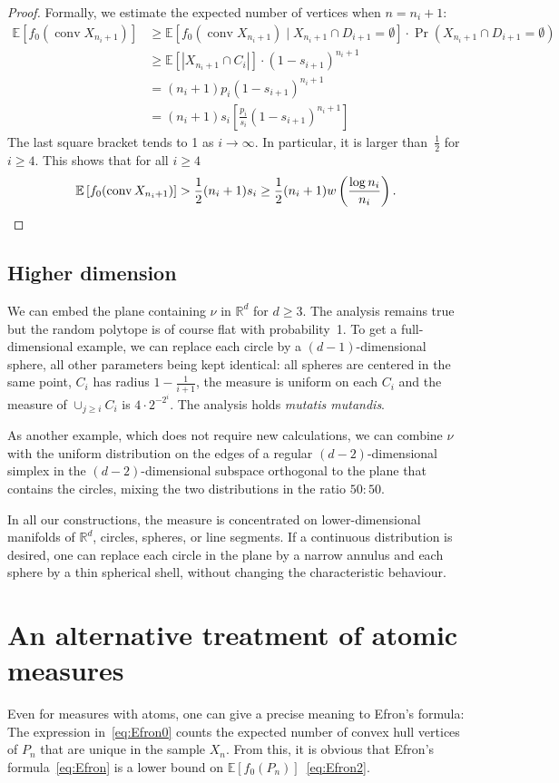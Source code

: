 \documentclass[10pt]{amsart}
\theoremstyle{definition}\newtheorem{defi}[theo]{Definition}\newtheorem{rema}[theo]{Remark}\newtheorem{exam}[theo]{Example}\newtheorem{exem}[theo]{Example}\newtheorem{nota}[theo]{Notation}
\DeclareMathOperator{\conv}{conv}
\newcommand{\Rbb}{\mathbb{R}}%
\newcommand{\Ebb}{\mathbb{E}}%
\newcommand{\ptb}[1]{\left[#1 \right]}
\newcommand*{\mtfrac}[2]{\frac{#1}{#2}}%
\begin{document}
\goodbreak
\begin{proof}
Formally, we estimate the expected number of vertices when $n=n_i+1$:
\begin{align*}
\Ebb\ptb{f_0(\conv X_{n_i+1})}
&\ge\Ebb\ptb{f_0(\conv X_{n_i+1})\mid X_{n_i+1}\cap D_{i+1}=\emptyset} \cdot
\Pr(X_{n_i+1}\cap D_{i+1}=\emptyset)\\
&\ge\Ebb[|X_{n_i+1}\cap C_i|]\cdot(1-s_{i+1})^{n_i+1}\\
&=(n_i+1)p_i(1-s_{i+1})^{n_i+1}\\
&=(n_i+1)s_i\left[\frac {p_i}{s_i}(1-s_{i+1})^{n_i+1}\right]
\end{align*}
The last square bracket tends to 1 as $i \to \infty$. In particular, it is larger than~$\frac 12$ for $i \ge 4$. This shows that for all $i\ge 4$
\[
\Ebb\ptb{f_0(\conv X_{n_i+1})}>\frac 12 (n_i+1)s_i
\ge
\frac 12(n_i+1)w\left(\mtfrac{\log n_i} {n_i}\right).
\qedhere
\]
\end{proof}


\subsection{Higher dimension}

We can embed the plane containing $\nu$ in $\Rbb^d$ for $d \ge 3$. The analysis remains true but the random polytope is of course flat with probability~1. To get a full-dimensional example, we can replace each circle by a $(d-1)$-dimensional sphere, all other parameters being kept identical: all spheres are centered in the same point, $C_i$ has radius $1-\frac{1}{i+1}$, the measure is uniform on each $C_i$ and the measure of $\cup_{j \ge i} C_i$ is $4 \cdot 2^{-2^i}$. The analysis holds
\emph{mutatis mutandis}.

As another example, which does not require new calculations, we can combine $\nu$ with the uniform distribution on the edges of a regular $(d-2)$-dimensional simplex in the $(d-2)$-dimensional subspace orthogonal to the plane that contains the circles, mixing the two distributions in the ratio $50:50$.

In all our constructions, the measure is concentrated on lower-dimensional manifolds of $\Rbb^d$, circles, spheres, or line segments. If a continuous distribution is desired, one can replace each circle in the plane by a narrow annulus and each sphere by a thin spherical shell, without changing the characteristic behaviour.


\section{An alternative treatment of atomic measures}\label{sec:alternative}
Even for measures with atoms, one can give a precise meaning to Efron's formula: The expression in~\eqref{eq:Efron0} counts the expected number of convex hull vertices of $P_n$ that are unique in the sample $X_n$. From this, it is obvious that Efron's formula~\eqref{eq:Efron} is a lower bound on $\Ebb[f_0(P_n)]$~\eqref{eq:Efron2}.
\end{document}
